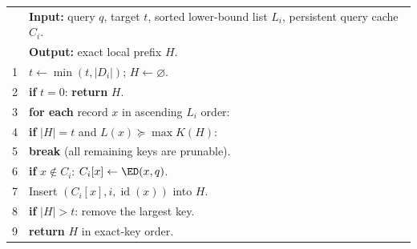 \begin{algorithm}[t]
\caption{Reusable local prefix search}
\label{alg:local}
\small
\begin{tabular}{r p{}}
 & \textbf{Input:} query $q$, target $t$, sorted lower-bound list $L_i$, persistent query cache $C_i$.\\
 & \textbf{Output:} exact local prefix $H$.\\
1 & $t\gets\min(t,|D_i|)$; $H\gets\varnothing$.\\
2 & \textbf{if} $t=0$: \textbf{return} $H$.\\
3 & \textbf{for each} record $x$ in ascending $L_i$ order:\\
4 & \quad \textbf{if} $|H|=t$ and $L(x)\succeq\max K(H)$:\\
5 & \qquad \textbf{break} (all remaining keys are prunable).\\
6 & \quad \textbf{if} $x\notin C_i$: $C_i[x]\gets\ED(x,q)$.\\
7 & \quad Insert $(C_i[x],i,\operatorname{id}(x))$ into $H$.\\
8 & \quad \textbf{if} $|H|>t$: remove the largest key.\\
9 & \textbf{return} $H$ in exact-key order.\\
\end{tabular}
\end{algorithm}

